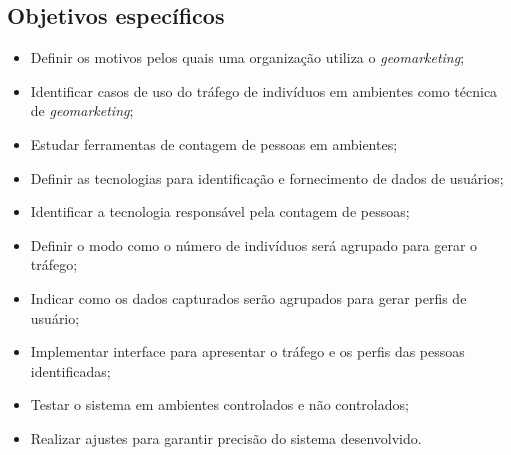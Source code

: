 \subsection{Objetivos específicos}
\begin{itemize}
  \item Definir os motivos pelos quais uma organização utiliza o \emph{geomarketing};
  \item Identificar casos de uso do tráfego de indivíduos em ambientes como técnica
  de \emph{geomarketing};
  \item Estudar ferramentas de contagem de pessoas em ambientes;
  \item Definir as tecnologias para identificação e fornecimento de dados de usuários;
  \item Identificar a tecnologia responsável pela contagem de pessoas;
  \item Definir o modo como o número de indivíduos será agrupado para gerar o tráfego;
  \item Indicar como os dados capturados serão agrupados para gerar perfis de usuário;
  \item Implementar interface para apresentar o tráfego e os perfis das pessoas identificadas;
  \item Testar o sistema em ambientes controlados e não controlados;
  \item Realizar ajustes para garantir precisão do sistema desenvolvido.
\end{itemize}

